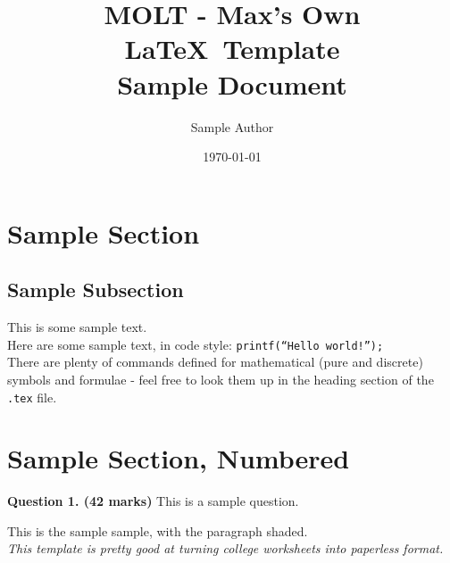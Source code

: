 \documentclass[a4paper]{article}
\title{MOLT - Max's Own \LaTeX \ Template \\ Sample Document}
\author{Sample Author}
\date{\today}
\newcommand{\code}[1]{\texttt{#1}}
\begin{document}
\maketitle

\section*{Sample Section}

\subsection*{Sample Subsection}
This is some sample text. \\

Here are some sample text, in code style: \code{printf(``Hello world!'');} \\

There are plenty of commands defined for mathematical (pure and discrete) symbols and formulae - feel free to look them up in the heading section of the \code{.tex} file.

\newpage

\section{Sample Section, Numbered}

\textbf{Question 1. (42 marks)} This is a sample question. 

\begin{shaded}
    This is the sample sample, with the paragraph shaded. \\
    
    \emph{This template is pretty good at turning college worksheets into paperless format.}
\end{shaded}
\end{document}
